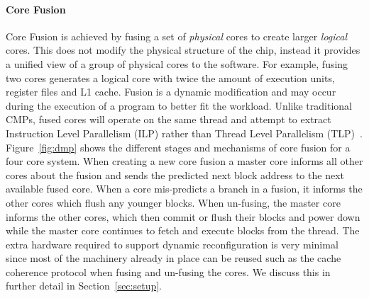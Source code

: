 \paragraph{Core Fusion} 
Core Fusion is achieved by fusing a set of \textit{physical} cores to create larger \textit{logical} cores.
This does not modify the physical structure of the chip, instead it provides a unified view of a group of physical cores to the software.
For example, fusing two cores generates a logical core with twice the amount of execution units, register files and L1 cache.
Fusion is a dynamic modification and may occur during the execution of a program to better fit the workload.
Unlike traditional CMPs, fused cores will operate on the same thread and attempt to extract Instruction Level Parallelism (ILP) rather than Thread Level Parallelism (TLP)~\cite{micolet2016dmpstream,pricopi2012bahurupi}.
Figure~\ref{fig:dmp} shows the different stages and mechanisms of core fusion for a four core system.
When creating a new core fusion a master core informs all other cores about the fusion and sends the predicted next block address to the next available fused core.
When a core mis-predicts a branch in a fusion, it informs the other cores which flush any younger blocks.
When un-fusing, the master core informs the other cores, which then commit or flush their blocks and power down while the master core continues to fetch and execute blocks from the thread.
The extra hardware required to support dynamic reconfiguration is very minimal~\cite{kim2007tflex} since most of the machinery already in place can be reused such as the cache coherence protocol when fusing and un-fusing the cores.
We discuss this in further detail in Section~\ref{sec:setup}.
